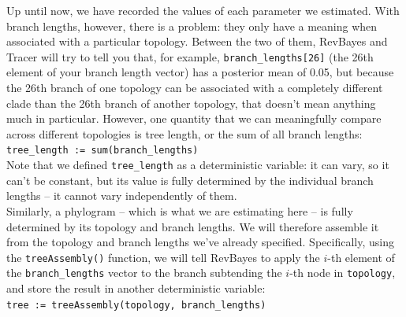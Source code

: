 \documentclass[12pt]{article}
\begin{document}
\noindent Up until now, we have recorded the values of each parameter we estimated. With branch lengths, however, there is a problem: they only have a meaning when associated with a particular topology. Between the two of them, RevBayes and Tracer will try to tell you that, for example, \texttt{branch\_lengths[26]} (the 26th element of your branch length vector) has a posterior mean of 0.05, but because the 26th branch of one topology can be associated with a completely different clade than the 26th branch of another topology, that doesn't mean anything much in particular. However, one quantity that we can meaningfully compare across different topologies is tree length, or the sum of all branch lengths: \\

\indent \texttt{tree\_length := sum(branch\_lengths)} \\

\noindent Note that we defined \texttt{tree\_length} as a deterministic variable: it can vary, so it can't be constant, but its value is fully determined by the individual branch lengths -- it cannot vary independently of them. \\

\noindent Similarly, a phylogram -- which is what we are estimating here -- is fully determined by its topology and branch lengths. We will therefore assemble it from the topology and branch lengths we've already specified. Specifically, using the \texttt{treeAssembly()} function, we will tell RevBayes to apply the $i$-th element of the \texttt{branch\_lengths} vector to the branch subtending the $i$-th node in \texttt{topology}, and store the result in another deterministic variable: \\

\indent \texttt{tree := treeAssembly(topology, branch\_lengths)}
\end{document}

